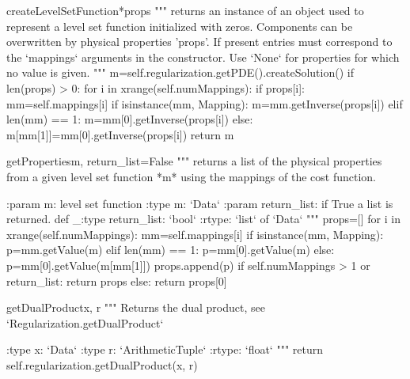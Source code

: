 \begin{methoddesc}[InversionCostFunction]{createLevelSetFunction}{*props}
        """
        returns an instance of an object used to represent a level set function
        initialized with zeros. Components can be overwritten by physical
        properties 'props'. If present entries must correspond to the
        `mappings` arguments in the constructor. Use `None` for properties for
        which no value is given.
        """
        m=self.regularization.getPDE().createSolution()
        if len(props) > 0:
           for i in xrange(self.numMappings): 
              if props[i]: 
                  mm=self.mappings[i]
                  if isinstance(mm, Mapping):
                      m=mm.getInverse(props[i])
                  elif len(mm) == 1:
                      m=mm[0].getInverse(props[i])
                  else:
                      m[mm[1]]=mm[0].getInverse(props[i])
        return m
\end{methoddesc}
    
\begin{methoddesc}[InversionCostFunction]{getProperties}{m, return_list=False}
        """
        returns a list of the physical properties from a given level set
        function *m* using the mappings of the cost function.
        
        :param m: level set function
        :type m: `Data`
        :param return_list: if True a list is returned. 
            def _:type return_list: `bool`
        :rtype: `list` of `Data`
        """
        props=[]
        for i in xrange(self.numMappings): 
           mm=self.mappings[i]
           if isinstance(mm, Mapping):
               p=mm.getValue(m)
           elif len(mm) == 1:
               p=mm[0].getValue(m)
           else:
               p=mm[0].getValue(m[mm[1]])
           props.append(p)
        if self.numMappings > 1 or return_list:
           return props
        else:
           return props[0]
\end{methoddesc}
           
\begin{methoddesc}[InversionCostFunction]{getDualProduct}{x, r}
        """
        Returns the dual product, see `Regularization.getDualProduct`

        :type x: `Data`
        :type r: `ArithmeticTuple`             
        :rtype: `float`
        """
        return self.regularization.getDualProduct(x, r)
\end{methoddesc}

